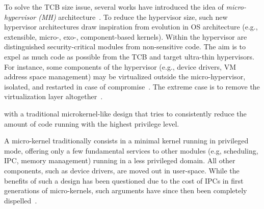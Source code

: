 \documentclass{sig-alternate}
\begin{document}
\noindent To solve the TCB size issue, several works have introduced the idea of \textit{micro-hypervisor (MH)} architecture~\cite{nova, NoHype, xmhf}. To reduce the hypervisor size, such new hypervisor architectures draw inspiration from evolution in OS architecture (e.g., extensible, micro-, exo-, component-based kernels). Within the hypervisor are distinguished security-critical modules from non-sensitive code. The aim is to expel as much code as possible from the TCB and target ultra-thin hypervisors. For instance, some components of the hypervisor (e.g., device drivers, VM address space management) may be virtualized outside the micro-hypervisor, isolated, and restarted in case of compromise~\cite{nova}. The extreme case is to remove the virtualization layer altogether~\cite{NoHype}.

with a traditional microkernel-like design that tries to consistently reduce the amount of code running with the highest privilege level. 

A micro-kernel traditionally consists in a minimal kernel running in privileged mode, offering only a few fundamental services to other modules (e.g, scheduling, IPC, memory management) running in a less privileged domain. All other components, such as device drivers, are moved out in user-space. While the benefits of such a design has been questioned due to the cost of IPCs in first generations of micro-kernels, such arguments have since then been completely dispelled~\cite{liedtke1993ImpIPCbyKerDes,liedtke1995micConnova}.
\end{document}
